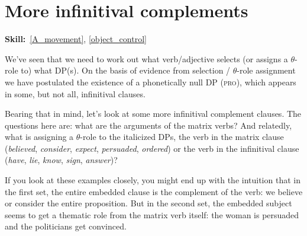 \documentclass{article}
\begin{document}
\section{More infinitival complements}
\hfill{}\textbf{Skill:}~\ref{A_movement}, \ref{object_control}

We've seen that we need to work out what verb/adjective selects (or assigns a $\theta$-role to) what DP(s).
On the basis of evidence from selection / $\theta$-role assignment we have postulated the existence of a phonetically null DP (\textsc{pro}), which appears in some, but not all, infinitival clauses.

Bearing that in mind, let's look at some more infinitival complement clauses.
The questions here are: what are the arguments of the matrix verbs? And relatedly, what is assigning a $\theta$-role to the italicized DPs, the verb in the matrix clause (\emph{believed}, \emph{consider}, \emph{expect}, \emph{persuaded}, \emph{ordered}) or the verb in the infinitival clause (\emph{have}, \emph{lie}, \emph{know}, \emph{sign}, \emph{answer})?
\begin{exe}
\end{exe}

If you look at these examples closely, you might end up with the intuition that in the first set, the entire embedded clause is the complement of the verb: we believe or consider the entire proposition. But in the second set, the embedded subject seems to get a thematic role from the matrix verb itself: the woman is persuaded and the politicians get convinced.
\end{document}
